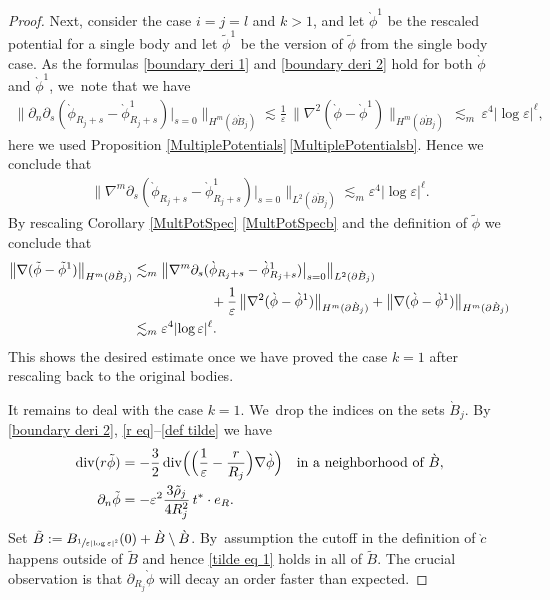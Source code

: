 \documentclass[10pt]{amsart}
\let\epsilon\varepsilon
\let\backslash\setminus
\theoremstyle{definition}
\renewcommand{\div}{\operatorname{div}}
\newcommand\bnorm[1]{\bigl\lVert #1\bigr\rVert}
\newcommand\eq{=}
\let\de\partial
\let\eps\epsilon
\begin{document}
\begin{proof}
Next, consider the case $i=j=l$ and $k>1$, and let $\grave{\phi}^1$ be the rescaled potential for a single body and let $\tilde{\phi}^1$ be the version of $\tilde{\phi}$ from the single body case. As the formulas \eqref{boundary deri 1} and \eqref{boundary deri 2} hold for both $\grave{\phi}$ and $\grave{\phi}^1$, we~note that we have
\begin{align*}
\bnorm{\de_n\de_{s}(\grave{\phi}_{R_j+s}-\grave{\phi}_{R_j+s}^1)\big|_{s=0}}_{H^m(\de\grave{B}_j)}\lesssim \frac{1}{\eps}\,\bnorm{\nabla^2(\grave{\phi}-\grave{\phi}^1)}_{H^m(\de\grave{B}_j)}\,\lesssim_m \, \eps^{4}|{\log\eps}|^\ell,
\end{align*}
here we used Proposition \ref{MultiplePotentials}\,\eqref{MultiplePotentialsb}. Hence we conclude that
\begin{align*}
\bnorm{\nabla^m\de_{s}(\grave{\phi}_{R_j+s}-\grave{\phi}_{R_j+s}^1)\big|_{s=0}}_{L^2(\de\grave{B}_j)}\lesssim_m\eps^{4}|{\log\eps}|^\ell.
\end{align*}
By rescaling Corollary \ref{MultPotSpec} \eqref{MultPotSpecb} and the definition of $\tilde{\phi}$ we conclude that
\begin{align*}
\bnorm{\nabla(\tilde{\phi}-\tilde{\phi}^1)}_{H^m(\de\grave{B}_j)}&\lesssim_m \bnorm{\nabla^m\de_{s}(\grave{\phi}_{R_j+s}-\grave{\phi}_{R_j+s}^1)\big|_{s=0}}_{L^2(\de\grave{B}_j)}\\
&\hspace*{2cm}+ \frac{1}{\eps}\,\bnorm{\nabla^2(\grave{\phi}-\grave{\phi}^1)}_{H^m(\de\grave{B}_j)}+\bnorm{\nabla(\grave{\phi}-\grave{\phi}^1)}_{H^m(\de\grave{B}_j)}\\
&\lesssim_m \eps^{4}|{\log\eps}|^\ell.
\end{align*}
This shows the desired estimate once we have proved the case $k=1$ after rescaling back to the original bodies.

It remains to deal with the case $k=1$. We~drop the indices on the sets $\grave{B}_j$.
By \eqref{boundary deri 2}, \eqref{r eq}--\eqref{def tilde} we have
\begin{align}
\div(r\tilde{\phi})&\eq-\frac{3}{2}\div\Bigl(\Bigl(\frac{1}{\eps}-\frac{r}{R_j}\Bigr)\nabla\grave{\phi}\Bigr)\quad\text{in a neighborhood of $\grave{B}$},\label{tilde eq 1}\\
\de_n\tilde{\phi}&\eq-\eps^2\frac{3\tilde{\rho}_j}{4R_j^2}\,t^*\cdot e_R\label{tilde eq 2}.
\end{align}
Set $\tilde{B}:=B_{\sfrac{1}{\eps|{\log\eps}|^2}}(0)+\grave{B}\backslash\grave{B}$. By~assumption the cutoff in the definition of $\grave{c}$ happens outside of $\tilde{B}$ and hence \eqref{tilde eq 1} holds in all of $\tilde{B}$.
The crucial observation is that $\de_{R_j}\grave{\phi}$ will decay an order faster than expected.


\end{proof}
\end{document}
